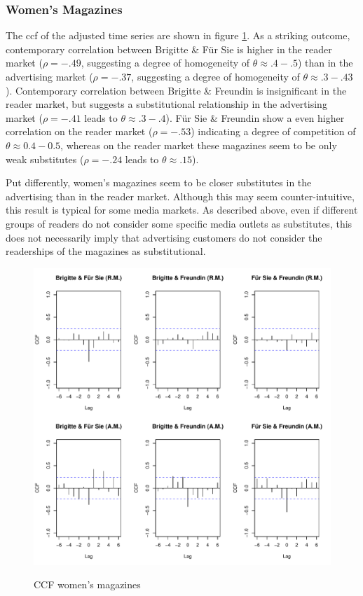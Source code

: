 \documentclass[12pt,a4paper,notitlepage]{article}
\begin{document}
\subsubsection{Women's Magazines}

The ccf of the adjusted time series are shown in figure \ref{fig_ccf_women}. As a striking outcome, contemporary correlation between Brigitte \& Für Sie is higher in the reader market ($\rho=-.49$, suggesting a degree of homogeneity of $\theta\approx.4-.5$) than in the advertising market ($\rho=-.37$, suggesting a degree of homogeneity of $\theta\approx.3-.43$). Contemporary correlation between Brigitte \& Freundin is insignificant in the reader market, but suggests a substitutional relationship in the advertising market ($\rho=-.41$ leads to $\theta\approx.3-.4$). Für Sie \& Freundin show a even higher correlation on the reader market ($\rho=-.53$) indicating a degree of competition of $\theta\approx0.4-0.5$, whereas on the reader market these magazines seem to be only weak substitutes ($\rho=-.24$ leads to $\theta \approx .15$).

Put differently, women's magazines seem to be closer substitutes in the advertising than in the reader market. Although this may seem counter-intuitive, this result is typical for some media markets. As described above, even if different groups of readers do not consider some specific media outlets as substitutes, this does not necessarily imply that advertising customers do not consider the readerships of the magazines as substitutional. 

\begin{figure}[H]
\caption{CCF women's magazines}
	\centering
	\includegraphics[scale=0.5]{../figs/ccf_women}
	\label{fig_ccf_women}
\end{figure}
\end{document}
